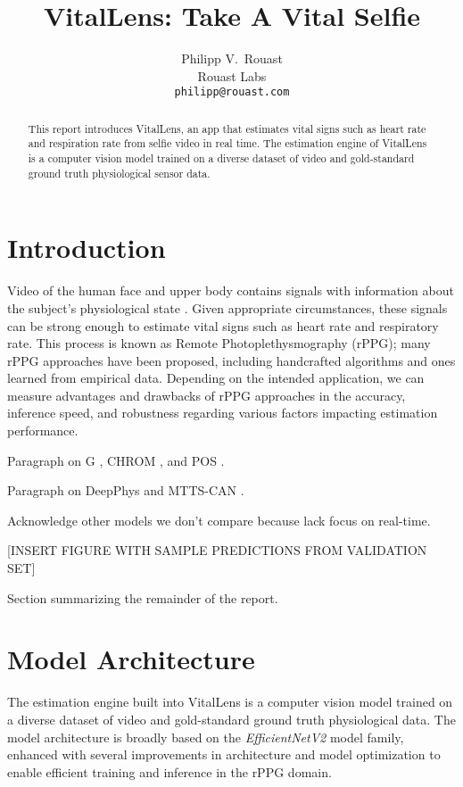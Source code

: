 \documentclass{article}
\title{VitalLens: Take A Vital Selfie}
\author{%
  Philipp V.~Rouast \\
  Rouast Labs\\
  \texttt{philipp@rouast.com} \\
}
\begin{document}
\maketitle


\begin{abstract}
This report introduces VitalLens, an app that estimates vital signs such as heart rate and respiration rate from selfie video in real time.
The estimation engine of VitalLens is a computer vision model trained on a diverse dataset of video and gold-standard ground truth physiological sensor data.
\end{abstract}


\section{Introduction}
\label{sec:introduction}

Video of the human face and upper body contains signals with information about the subject's physiological state \citep{verkruysse2008remote}.
Given appropriate circumstances, these signals can be strong enough to estimate vital signs such as heart rate and respiratory rate.
This process is known as Remote Photoplethysmography (rPPG); many rPPG approaches have been proposed, including handcrafted algorithms and ones learned from empirical data.
Depending on the intended application, we can measure advantages and drawbacks of rPPG approaches in the accuracy, inference speed, and robustness regarding various factors impacting estimation performance.

Paragraph on G \cite{verkruysse2008remote}, CHROM \cite{de2013robust}, and POS \cite{wang2017algorithmic}.

Paragraph on DeepPhys \cite{chen2018deep} and MTTS-CAN \cite{liu2020multi}.

Acknowledge other models we don't compare because lack focus on real-time.

[INSERT FIGURE WITH SAMPLE PREDICTIONS FROM VALIDATION SET]

Section summarizing the remainder of the report.

\section{Model Architecture}
\label{sec:scope}

The estimation engine built into VitalLens is a computer vision model trained on a diverse dataset of video and gold-standard ground truth physiological data.
The model architecture is broadly based on the \textit{EfficientNetV2} \cite{tan2021efficient} model family, enhanced with several improvements in architecture and model optimization to enable efficient training and inference in the rPPG domain.
\end{document}

